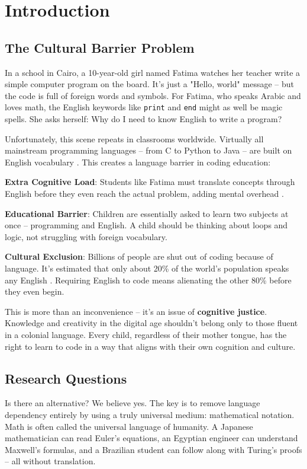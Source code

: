 \documentclass[10pt,conference]{IEEEtran}
\begin{document}
\section{Introduction}

\subsection{The Cultural Barrier Problem}

In a school in Cairo, a 10-year-old girl named Fatima watches her teacher write a simple computer program on the board. It's just a "Hello, world" message – but the code is full of foreign words and symbols. For Fatima, who speaks Arabic and loves math, the English keywords like \texttt{print} and \texttt{end} might as well be magic spells. She asks herself: Why do I need to know English to write a program?

Unfortunately, this scene repeats in classrooms worldwide. Virtually all mainstream programming languages – from C to Python to Java – are built on English vocabulary \cite{wikipedia2023}. This creates a language barrier in coding education:

\textbf{Extra Cognitive Load}: Students like Fatima must translate concepts through English before they even reach the actual problem, adding mental overhead \cite{sweller2011}.

\textbf{Educational Barrier}: Children are essentially asked to learn two subjects at once – programming and English. A child should be thinking about loops and logic, not struggling with foreign vocabulary.

\textbf{Cultural Exclusion}: Billions of people are shut out of coding because of language. It's estimated that only about 20\% of the world's population speaks any English \cite{unesco2016}. Requiring English to code means alienating the other 80\% before they even begin.

This is more than an inconvenience – it's an issue of \textbf{cognitive justice}. Knowledge and creativity in the digital age shouldn't belong only to those fluent in a colonial language. Every child, regardless of their mother tongue, has the right to learn to code in a way that aligns with their own cognition and culture.

\subsection{Research Questions}

Is there an alternative? We believe yes. The key is to remove language dependency entirely by using a truly universal medium: mathematical notation. Math is often called the universal language of humanity. A Japanese mathematician can read Euler's equations, an Egyptian engineer can understand Maxwell's formulas, and a Brazilian student can follow along with Turing's proofs – all without translation.
\end{document}
